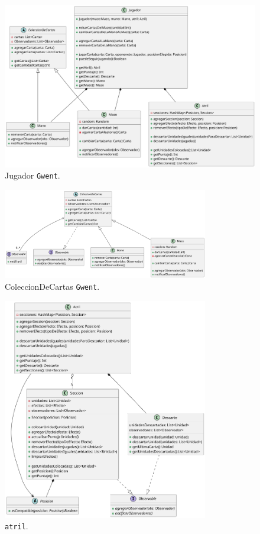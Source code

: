 \documentclass[titlepage,a4paper]{article}
\begin{document}
	\begin{figure}[H]
		\centering
		\includegraphics[width=1\textwidth]{diagramas/clases/Jugador}
		\caption{\label{fig:class02}Jugador \texttt{Gwent}.}
	\end{figure}

	\begin{figure}[H]
		\centering
		\includegraphics[width=0.8\textwidth]{diagramas/clases/ColeccionDeCartas}
		\caption{\label{fig:class03} ColeccionDeCartas \texttt{Gwent}.}
	\end{figure}

	\begin{figure}[H]
		\centering
		\includegraphics[width=0.8\textwidth]{diagramas/clases/Atril}
		\caption{\label{fig:class04}  \texttt{atril}.}
	\end{figure}
\end{document}
